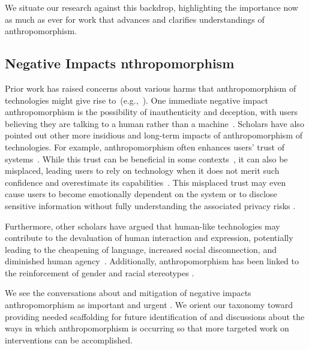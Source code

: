We situate our research against this backdrop, highlighting the importance now as much as ever for work that advances and clarifies understandings of anthropomorphism. 


\subsection{Negative Impacts  nthropomorphism } \label{RWharms}
Prior work has raised concerns about various harms that anthropomorphism of technologies might give rise to~(e.g.,~\cite{ferrari2016blurring,friedman1992human, bender2021on, akbulut2024all}). One immediate negative impact  anthropomorphism  is the possibility of inauthenticity and deception, with users believing they are talking to a human rather than a machine~\cite{Gros2021-jh,Gros2022-eq, Schneidernnan1988-nz}. %
%
Scholars have also pointed out other more insidious and long-term impacts of anthropomorphism of technologies. For example, anthropomorphism  often enhances users' trust of systems~\cite{Troshani2020-qp}. While this trust can be beneficial in some contexts~\cite{Yanai2020-wi}, it can also be misplaced, leading users to rely on technology when it does not merit such confidence and overestimate its capabilities~\cite{abercrombie2023mirages, Kim2024-sv,Ibrahim2024-ym,Chien2024-sd, luger2016like}. This misplaced trust may even cause users to become emotionally dependent on the system or to disclose sensitive information without fully understanding the associated privacy risks \cite{Ischen2020-it, Ibrahim2024-ym}. 

Furthermore, other scholars have argued that human-like technologies may contribute to the devaluation of human interaction and expression, potentially leading to the cheapening of language, increased social disconnection, and diminished human agency~\cite{Porra2020-dq, Turkle2013-te,Weidinger2022-pz,Watson2019-py}. Additionally, anthropomorphism has been linked to the reinforcement of gender and racial stereotypes \cite{Bender2024-de,Erscoi_undated-nf,Maeda2024-cv,abercrombie2023mirages}.

We see the conversations about and mitigation of negative impacts  anthropomorphism  as important and urgent \cite{cheng2024i}. We orient our taxonomy toward providing needed scaffolding for future identification of and discussions about the ways in which anthropomorphism is occurring so that more targeted work on interventions can be accomplished.


